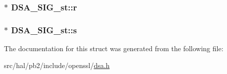 \subsubsection[{\texorpdfstring{r}{r}}]{$\ast$ D\+S\+A\+\_\+\+S\+I\+G\+\_\+st\+::r}\hypertarget{struct_d_s_a___s_i_g__st_a745899b460d408e175d9adee66ef046e}{}\label{struct_d_s_a___s_i_g__st_a745899b460d408e175d9adee66ef046e}
\subsubsection[{\texorpdfstring{s}{s}}]{$\ast$ D\+S\+A\+\_\+\+S\+I\+G\+\_\+st\+::s}\hypertarget{struct_d_s_a___s_i_g__st_ae7c55f852d6ca0b46b5d5c99dcfb8c2d}{}\label{struct_d_s_a___s_i_g__st_ae7c55f852d6ca0b46b5d5c99dcfb8c2d}


The documentation for this struct was generated from the following file\+:\begin{DoxyCompactItemize}
\item 
src/hal/pb2/include/openssl/\hyperlink{dsa_8h}{dsa.\+h}\end{DoxyCompactItemize}
